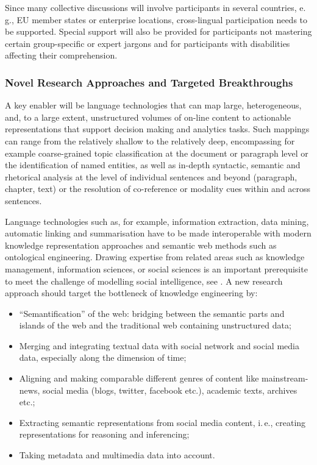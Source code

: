\documentclass[10pt, plain]{../../metanetpaper}
\begin{document}
\begin{multicols}{2}
Since many collective discussions will involve participants in several countries, e.\,g., EU member states or enterprise locations, cross-lingual participation needs to be supported. Special support will also be provided for participants not mastering certain group-specific or expert jargons and for participants with disabilities affecting their comprehension.

\subsubsection{Novel Research Approaches and Targeted Breakthroughs}
\label{sec:novel-rese-appr-pt2}

A key enabler will be language technologies that can map large, heterogeneous, and, to a large extent, unstructured volumes of on-line content to actionable representations that support decision making and analytics tasks. Such mappings can range from the relatively shallow to the relatively deep, encompassing for example coarse-grained topic classification at the document or paragraph level or the identification of named entities, as well as in-depth syntactic, semantic and rhetorical analysis at the level of individual sentences and beyond (paragraph, chapter, text) or the resolution of co-reference or modality cues within and across sentences.
 
Language technologies such as, for example, information extraction, data mining, automatic linking and summarisation have to be made interoperable with modern knowledge representation approaches and semantic web methods such as ontological engineering. Drawing expertise from related areas such as knowledge management, information sciences, or social sciences is an important prerequisite to meet the challenge of modelling social intelligence, see \cite{ltds2012}. A new research approach should target the bottleneck of knowledge engineering by:

\begin{itemize}
\item “Semantification” of the web: bridging between the semantic parts and islands of the web and the traditional web containing unstructured data;
\item Merging and integrating textual data with social network and social media data, especially along the dimension of time;
\item Aligning and making comparable different genres of content like mainstream-news, social media (blogs, twitter, facebook etc.), academic texts, archives etc.;
\item Extracting semantic representations from social media content, i.\,e., creating representations for reasoning and inferencing;
\item Taking metadata and multimedia data into account.
\end{itemize}


\end{multicols}
\end{document}
